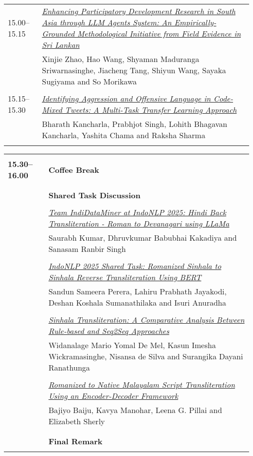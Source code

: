 \begin{tabular}{p{20mm}p{128mm}}
15.00--15.15 & \hyperlink{page.134}{\em Enhancing Participatory Development Research in South Asia through LLM Agents System: An Empirically-Grounded Methodological Initiative from Field Evidence in Sri Lankan}\\
         & Xinjie Zhao, Hao Wang, Shyaman Maduranga Sriwarnasinghe, Jiacheng Tang, Shiyun Wang, Sayaka Sugiyama and So Morikawa \\
\\

15.15--15.30 & \hyperlink{page.148}{\em Identifying Aggression and Offensive Language in Code-Mixed Tweets: A Multi-Task Transfer Learning Approach}\\
         & Bharath Kancharla, Prabhjot Singh, Lohith Bhagavan Kancharla, Yashita Chama and Raksha Sharma \\
\\

\end{tabular}
\newpage
\begin{tabular}{p{20mm}p{128mm}}
\\
\\{\bf 15.30--16.00} & {\bf Coffee Break} \\
\\
\\ & {\bf Shared Task Discussion} \\
\\
 & \hyperlink{page.155}{\em Team IndiDataMiner at IndoNLP 2025: Hindi Back Transliteration - Roman to Devanagari using LLaMa}\\
         & Saurabh Kumar, Dhruvkumar Babubhai Kakadiya and Sanasam Ranbir Singh \\
\\

 & \hyperlink{page.161}{\em IndoNLP 2025 Shared Task: Romanized Sinhala to Sinhala Reverse Transliteration Using BERT}\\
         & Sandun Sameera Perera, Lahiru Prabhath Jayakodi, Deshan Koshala Sumanathilaka and Isuri Anuradha \\
\\

 & \hyperlink{page.168}{\em Sinhala Transliteration: A Comparative Analysis Between Rule-based and Seq2Seq Approaches}\\
         & Widanalage Mario Yomal De Mel, Kasun Imesha Wickramasinghe, Nisansa de Silva and Surangika Dayani Ranathunga \\
\\

 & \hyperlink{page.177}{\em Romanized to Native Malayalam Script Transliteration Using an Encoder-Decoder Framework}\\
         & Bajiyo Baiju, Kavya Manohar, Leena G. Pillai and Elizabeth Sherly \\
\\

\\ & {\bf Final Remark} \\
\\


\end{tabular}
